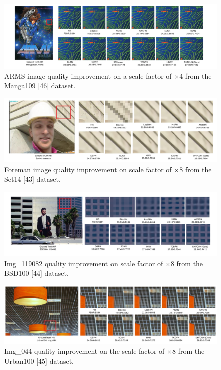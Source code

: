 \documentclass{ieeeaccess}
\begin{document}
\begin{figure}
    \centering

    \includegraphics[width=\linewidth]{15Figure.pdf}
    \caption{ARMS image quality improvement on a scale factor of $\times4$ from the Manga109 [46] dataset. }
    \label{fig:15}
\end{figure}


\begin{figure}
    \centering

    \includegraphics[width=\linewidth]{16Figure.pdf}
    \caption{Foreman image quality improvement on scale factor of $\times8$ from the Set14 [43] dataset.}
    \label{fig:16}
\end{figure}

\begin{figure}
    \centering

    \includegraphics[width=\linewidth]{17Figure.pdf}
    \caption{Img\_119082 quality improvement on scale factor of $\times8$ from the BSD100 [44] dataset.}
    \label{fig:17}
\end{figure}

\begin{figure}
    \centering

    \includegraphics[width=\linewidth]{18Figure.pdf}
    \caption{Img\_044 quality improvement on the scale factor of $\times8$ from the Urban100 [45] dataset.}
    \label{fig:18}
\end{figure}
\end{document}
